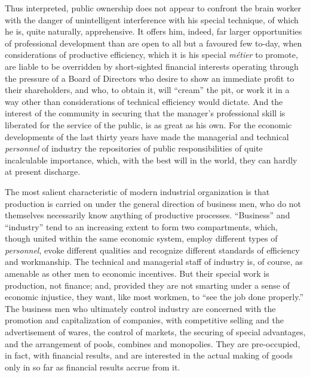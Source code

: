 \documentclass{book}
\begin{document}
Thus interpreted, public ownership does not appear to confront the brain worker with the danger of unintelligent interference with his special technique, of which he is, quite naturally, apprehensive. It offers him, indeed, far larger opportunities of professional development than are open to all but a favoured few to-day, when considerations of productive efficiency, which it is his special \emph{métier} to promote, are liable to be overridden by short-sighted financial interests operating through the pressure of a Board of Directors who desire to show an immediate profit to their shareholders, and who, to obtain it, will “cream” the pit, or work it in a way other than considerations of technical efficiency would dictate. And the interest of the community in securing that the manager’s professional skill is liberated for the service of the public, is as great as his own. For the economic developments of the last thirty years have made the managerial and technical \emph{personnel} of industry the repositories of public responsibilities of quite incalculable importance, which, with the best will in the world, they can hardly at present discharge.

The most salient characteristic of modern industrial organization is that production is carried on under the general direction of business men, who do not themselves necessarily know anything of productive processes. “Business” and “industry” tend to an increasing extent to form two compartments, which, though united within the same economic system, employ different types of \emph{personnel}, evoke different qualities and recognize different standards of efficiency and workmanship. The technical and managerial staff of industry is, of course, as amenable as other men to economic incentives. But their special work is production, not finance; and, provided they are not smarting under a sense of economic injustice, they want, like most workmen, to “see the job done properly.” The business men who ultimately control industry are concerned with the promotion and capitalization of companies, with competitive selling and the advertisement of wares, the control of markets, the securing of special advantages, and the arrangement of pools, combines and monopolies. They are pre-occupied, in fact, with financial results, and are interested in the actual making of goods only in so far as financial results accrue from it.
\end{document}
